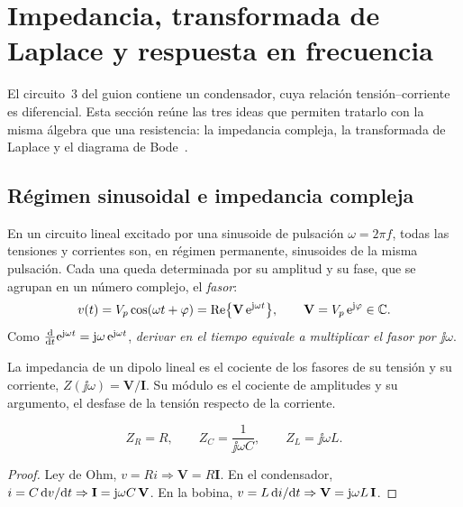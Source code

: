 \section{Impedancia, transformada de Laplace y respuesta en frecuencia}\label{sec:laplace}
El circuito~3 del guion contiene un condensador, cuya relación tensión--corriente es
diferencial. Esta sección reúne las tres ideas que permiten tratarlo con la misma
álgebra que una resistencia: la impedancia compleja, la transformada de Laplace y el
diagrama de Bode~\cite{TEORIA-LAPLACE,TEORIA-ADICIONAL}.

\subsection{Régimen sinusoidal e impedancia compleja}\label{sec:impedancia}
En un circuito lineal excitado por una sinusoide de pulsación $\omega=2\pi f$, todas las
tensiones y corrientes son, en régimen permanente, sinusoides de la misma pulsación. Cada una
queda determinada por su amplitud y su fase, que se agrupan en un número complejo, el \emph{fasor}:
\begin{equation}\label{eq:fasor}
  v(t)=V_p\cos(\omega t+\varphi)=\operatorname{Re}\bigl\{\mathbf{V}\,\mathrm{e}^{\mathrm{j}\omega t}\bigr\},\qquad
  \mathbf{V}=V_p\,\mathrm{e}^{\mathrm{j}\varphi}\in\mathbb{C} .
\end{equation}
Como $\frac{\mathrm{d}}{\mathrm{d} t}\mathrm{e}^{\mathrm{j}\omega t}=\mathrm{j}\omega\,\mathrm{e}^{\mathrm{j}\omega t}$, \emph{derivar en el tiempo equivale a
multiplicar el fasor por $\jj\omega$}.

\begin{definicion}[Impedancia]\label{def:impedancia}
La impedancia de un dipolo lineal es el cociente de los fasores de su tensión y su corriente,
$Z(\jj\omega)=\mathbf{V}/\mathbf{I}$. Su módulo es el cociente de amplitudes y su argumento, el
desfase de la tensión respecto de la corriente.
\end{definicion}

\begin{proposicion}\label{prop:impedancias}
\begin{equation}\label{eq:impedancias}
  Z_R=R,\qquad Z_C=\frac{1}{\jj\omega C},\qquad Z_L=\jj\omega L .
\end{equation}
\end{proposicion}
\begin{proof}
Ley de Ohm, $v=Ri\Rightarrow\mathbf{V}=R\mathbf{I}$. En el condensador, $i=C\,\mathrm{d} v/\mathrm{d} t\Rightarrow
\mathbf{I}=\mathrm{j}\omega C\,\mathbf{V}$. En la bobina, $v=L\,\mathrm{d} i/\mathrm{d} t\Rightarrow\mathbf{V}=\mathrm{j}\omega L\,\mathbf{I}$.
\end{proof}

